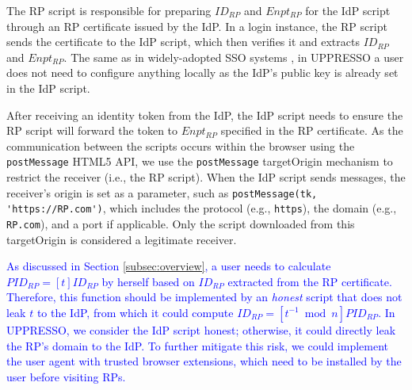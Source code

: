 
The RP script is responsible for preparing $ID_{RP}$ and $Enpt_{RP}$ for the IdP script
 through an RP certificate issued by the IdP. %
In a login instance, the RP script sends the certificate to the IdP script, which then verifies it and extracts $ID_{RP}$ and $Enpt_{RP}$.
The same as in widely-adopted SSO systems \cite{OpenIDConnect, rfc6749, SAML, SAMLIdentifier},
 in UPPRESSO a user does not need to configure anything locally as the IdP's public key is already set in the IdP script.

After receiving an identity token from the IdP, the IdP script needs to ensure the RP script will forward the token to $Enpt_{RP}$ %
specified in the RP certificate.
As the communication between the scripts occurs within the browser using the \verb+postMessage+ HTML5 API, %
we use the \verb+postMessage+ targetOrigin mechanism \cite{postm-targeto} to restrict the receiver (i.e., the RP script). When the IdP script sends messages, the receiver's origin is set as a parameter, such as \verb+postMessage(tk, 'https://RP.com')+, which includes the protocol (e.g., \verb+https+), the domain (e.g., \verb+RP.com+), and a port if applicable.
Only the script downloaded from this targetOrigin is considered a legitimate receiver.


\textcolor{blue}{As discussed in Section \ref{subsec:overview}, a user needs to calculate $PID_{RP} = [t]ID_{RP}$ by herself based on $ID_{RP}$ extracted from the RP certificate. Therefore, this function should be implemented by an \emph{honest} script that does not leak $t$ to the IdP, from which it could compute $ID_{RP} = [t^{-1}\bmod n]PID_{RP}$. In UPPRESSO, we consider the IdP script honest; otherwise, it could directly leak the RP's domain to the IdP. To further mitigate this risk, we could implement the user agent with trusted browser extensions, which need to be installed by the user before visiting RPs.}

